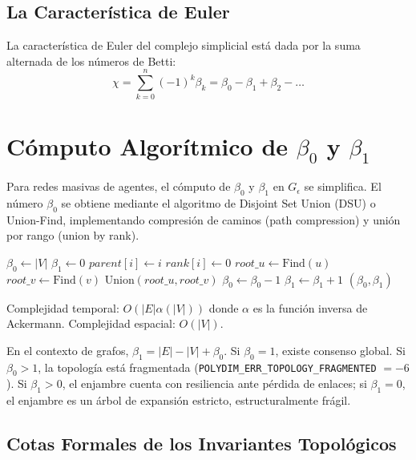 \subsection{La Característica de Euler}
La característica de Euler del complejo simplicial está dada por la suma alternada de los números de Betti:
\begin{equation}
    \chi = \sum_{k=0}^{n} (-1)^k \beta_k = \beta_0 - \beta_1 + \beta_2 - \dots
\end{equation}

\section{Cómputo Algorítmico de $\beta_0$ y $\beta_1$}
Para redes masivas de agentes, el cómputo de $\beta_0$ y $\beta_1$ en $G_\epsilon$ se simplifica. El número $\beta_0$ se obtiene mediante el algoritmo de Disjoint Set Union (DSU) o Union-Find, implementando compresión de caminos (path compression) y unión por rango (union by rank).

\begin{algorithm}

\begin{algorithmic}[1]
    \State $\beta_0 \gets |V|$
    \State $\beta_1 \gets 0$
        \State $parent[i] \gets i$
        \State $rank[i] \gets 0$
    \EndFor
        \State $root\_u \gets \text{Find}(u)$
        \State $root\_v \gets \text{Find}(v)$
            \State $\text{Union}(root\_u, root\_v)$
            \State $\beta_0 \gets \beta_0 - 1$
        \Else
            \State $\beta_1 \gets \beta_1 + 1$
        \EndIf
    \EndFor
    \State \Return $(\beta_0, \beta_1)$
\EndProcedure
\end{algorithmic}
\end{algorithm}
Complejidad temporal: $O(|E| \alpha(|V|))$ donde $\alpha$ es la función inversa de Ackermann. Complejidad espacial: $O(|V|)$.

En el contexto de grafos, $\beta_1 = |E| - |V| + \beta_0$. Si $\beta_0 = 1$, existe consenso global. Si $\beta_0 > 1$, la topología está fragmentada (\texttt{POLYDIM\_ERR\_TOPOLOGY\_FRAGMENTED} $=-6$). Si $\beta_1 > 0$, el enjambre cuenta con resiliencia ante pérdida de enlaces; si $\beta_1 = 0$, el enjambre es un árbol de expansión estricto, estructuralmente frágil.

\subsection{Cotas Formales de los Invariantes Topológicos}

